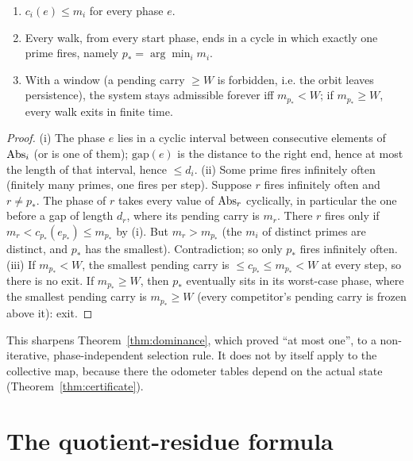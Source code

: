 \begin{theorem}\label{thm:minimax}
\begin{enumerate}[label=(\roman*),nosep]
\item \(c_i(e)\le m_i\) for every phase \(e\).
\item Every walk, from every start phase, ends in a cycle in which exactly one prime fires, namely \(p_\ast=\arg\min_im_i\).
\item With a window (a pending carry \(\ge W\) is forbidden, i.e. the orbit leaves persistence), the system stays admissible forever iff \(m_{p_\ast}<W\); if \(m_{p_\ast}\ge W\), every walk exits in finite time.
\end{enumerate}
\end{theorem}
\begin{proof}
(i) The phase \(e\) lies in a cyclic interval between consecutive elements of \(\operatorname{Abs}_i\) (or is one of them); \(\mathrm{gap}(e)\) is the distance to the right end, hence at most the length of that interval, hence \(\le d_i\).
(ii) Some prime fires infinitely often (finitely many primes, one fires per step). Suppose \(r\) fires infinitely often and \(r\ne p_\ast\). The phase of \(r\) takes every value of \(\operatorname{Abs}_r\) cyclically, in particular the one before a gap of length \(d_r\), where its pending carry is \(m_r\). There \(r\) fires only if \(m_r<c_{p_\ast}(e_{p_\ast})\le m_{p_\ast}\) by (i). But \(m_r>m_{p_\ast}\) (the \(m_i\) of distinct primes are distinct, and \(p_\ast\) has the smallest). Contradiction; so only \(p_\ast\) fires infinitely often.
(iii) If \(m_{p_\ast}<W\), the smallest pending carry is \(\le c_{p_\ast}\le m_{p_\ast}<W\) at every step, so there is no exit. If \(m_{p_\ast}\ge W\), then \(p_\ast\) eventually sits in its worst-case phase, where the smallest pending carry is \(m_{p_\ast}\ge W\) (every competitor's pending carry is frozen above it): exit.
\end{proof}

This sharpens Theorem~\ref{thm:dominance}, which proved ``at most one'', to a non-iterative, phase-independent selection rule. It does not by itself apply to the collective map, because there the odometer tables depend on the actual state (Theorem~\ref{thm:certificate}).

\section{The quotient-residue formula}

